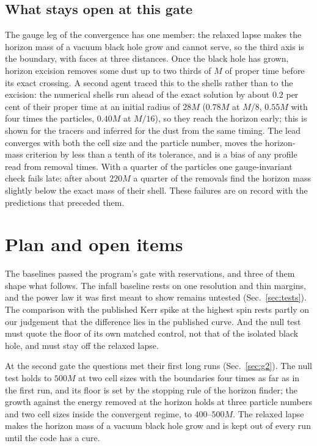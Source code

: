 \documentclass[aps,prd,twocolumn,10pt,superscriptaddress,nofootinbib,longbibliography,floatfix]{revtex4-2}
\begin{document}
\subsection{What stays open at this gate}

The gauge leg of the convergence has one member: the relaxed lapse makes the horizon mass of a vacuum black hole grow and cannot serve, so the third axis is the boundary, with faces at three distances. Once the black hole has grown, horizon excision removes some dust up to two thirds of $M$ of proper time before its exact crossing. A second agent traced this to the shells rather than to the excision: the numerical shells run ahead of the exact solution by about $0.2$ per cent of their proper time at an initial radius of $28M$ ($0.78M$ at $M/8$, $0.55M$ with four times the particles, $0.40M$ at $M/16$), so they reach the horizon early; this is shown for the tracers and inferred for the dust from the same timing. The lead converges with both the cell size and the particle number, moves the horizon-mass criterion by less than a tenth of its tolerance, and is a bias of any profile read from removal times. With a quarter of the particles one gauge-invariant check fails late: after about $220M$ a quarter of the removals find the horizon mass slightly below the exact mass of their shell. These failures are on record with the predictions that preceded them.

\section{Plan and open items}\label{sec:plan}

The baselines passed the program's gate with reservations, and three of them shape what follows. The infall baseline rests on one resolution and thin margins, and the power law it was first meant to show remains untested (Sec.~\ref{sec:tests}). The comparison with the published Kerr spike at the highest spin rests partly on our judgement that the difference lies in the published curve. And the null test must quote the floor of its own matched control, not that of the isolated black hole, and must stay off the relaxed lapse.

At the second gate the questions met their first long runs (Sec.~\ref{sec:g2}). The null test holds to $500M$ at two cell sizes with the boundaries four times as far as in the first run, and its floor is set by the stopping rule of the horizon finder; the growth against the energy removed at the horizon holds at three particle numbers and two cell sizes inside the convergent regime, to $400$--$500M$. The relaxed lapse makes the horizon mass of a vacuum black hole grow and is kept out of every run until the code has a cure.
\end{document}

